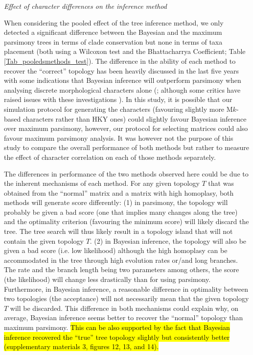 \documentclass[12pt,letterpaper]{article}
\renewcommand{\subsection}[1]{%
\bigskip
\begin{center}
\begin{large}
\normalfont\itshape #1
\end{large}
\end{center}}
\begin{document}
\subsection{Effect of character differences on the inference method}
When considering the pooled effect of the tree inference method, we only detected a significant difference between the Bayesian and the maximum parsimony trees in terms of clade conservation but none in terms of taxa placement (both using a Wilcoxon test and the Bhattacharrya Coefficient; Table \ref{Tab_pooledsmethods_test}).
The difference in the ability of each method to recover the ``correct'' topology has been heavily discussed in the last five years with some indications that Bayesian inference will outperform parsimony when analysing discrete morphological characters alone (\citealt{wrightbayesian2014,OReilly20160081,puttick2017uncertain}; although some critics have raised issues with these investigations \citealt{spencerefficacy2013,goloboff2017weighted}).
In this study, it is possible that our simulation protocol for generating the characters (favouring slightly more M$k$-based characters rather than HKY ones) could slightly favour Bayesian inference over maximum parsimony, however, our protocol for selecting matrices \citep[i.e. those with in a $CI>0.26$ in a quick preliminary parsimony search;][]{OReilly20160081} could also favour maximum parsimony analysis.
It was however not the purpose of this study to compare the overall performance of both methods but rather to measure the effect of character correlation on each of those methods separately.


The differences in performance of the two methods observed here could be due to the inherent mechanisms of each method.
For any given topology $T$ that was obtained from the ``normal'' matrix and a matrix with high homoplasy, both methods will generate score differently:
(1) in parsimony, the topology will probably be given a bad score (one that implies many changes along the tree) and the optimality criterion (favouring the minimum score) will likely discard the tree.
The tree search will thus likely result in a topology island that will not contain the given topology $T$.
(2) in Bayesian inference, the topology will also be given a bad score (i.e. low likelihood) although the high homoplasy can be accommodated in the tree through high evolution rates or/and long branches.
The rate and the branch length being two parameters among others, the score (the likelihood) will change less drastically than for using parsimony.
Furthermore, in Bayesian inference, a reasonable difference in optimality between two topologies (the acceptance) will not necessarily mean that the given topology $T$ will be discarded.
This difference in both mechanisms could explain why, on average, Bayesian inference seems better to recover the ``normal'' topology than maximum parsimony.
\hl{This can be also supported by the fact that Bayesian inference recovered the ``true'' tree topology slightly but consistently better (supplementary materials 3, figures 12, 13, and 14).}
\end{document}
